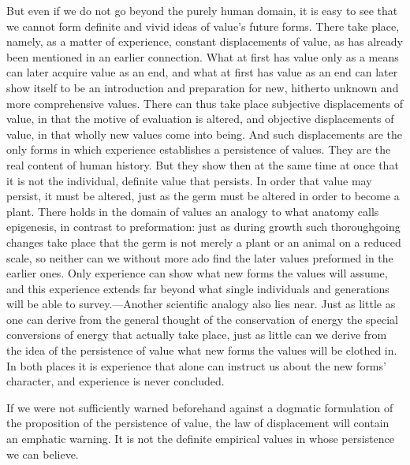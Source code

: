 \documentclass[12pt,a4paper]{book}
\newcommand{\opage}[1]{\marginnote{\footnotesize\textit{[#1]}}}
\begin{document}
But even if we do not go beyond the purely human domain, it is easy to see that we cannot form
definite and vivid ideas of value's future forms. There take place, namely, as a matter of
experience, constant displacements of value, as has already been mentioned in an earlier connection.
What at first has value only as a means can later acquire value as an end, and what at first has
value as an end can later show itself to be an introduction and preparation for new, hitherto unknown
and more comprehensive values. There can thus take place subjective displacements of value, in that
the motive of evaluation is altered, and objective displacements of value, in that wholly new values
come into being. And such displacements are the only forms in which experience establishes a
persistence of values. They are the real content of human history. But they show then at the same
time at once that it is not the individual, definite value that 
\opage{175}persists. In order that value may
persist, it must be altered, just as the germ must be altered in order to become a plant. There holds
in the domain of values an analogy to what anatomy calls epigenesis, in contrast to preformation:
just as during growth such thoroughgoing changes take place that the germ is not merely a plant or an
animal on a reduced scale, so neither can we without more ado find the later values preformed in the
earlier ones. Only experience can show what new forms the values will assume, and this experience
extends far beyond what single individuals and generations will be able to survey.---Another
scientific analogy also lies near. Just as little as one can derive from the general thought of the
conservation of energy the special conversions of energy that actually take place, just as little can
we derive from the idea of the persistence of value what new forms the values will be clothed in. In
both places it is experience that alone can instruct us about the new forms' character, and experience
is never concluded.

If we were not sufficiently warned beforehand against a dogmatic formulation of the proposition of the
persistence of value, the law of displacement will contain an emphatic warning. It is not the definite
empirical values in whose persistence we can believe.
\end{document}
